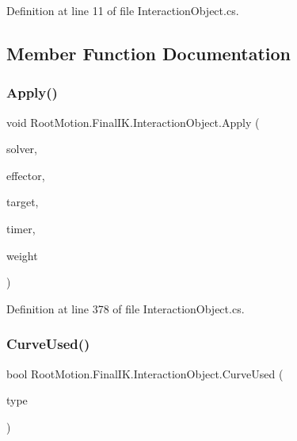 Definition at line 11 of file Interaction\+Object.\+cs.



\subsection{Member Function Documentation}
\mbox{\label{class_root_motion_1_1_final_i_k_1_1_interaction_object_a0aaccdd85aa57b6cbb254594846e18e1}} 
\subsubsection{\texorpdfstring{Apply()}{Apply()}}
{\footnotesize\ttfamily void Root\+Motion.\+Final\+I\+K.\+Interaction\+Object.\+Apply (\begin{DoxyParamCaption}\item[{\mbox{\hyperlink{class_root_motion_1_1_final_i_k_1_1_i_k_solver_full_body_biped}{I\+K\+Solver\+Full\+Body\+Biped}}}]{solver,  }\item[{\mbox{\hyperlink{namespace_root_motion_1_1_final_i_k_ae0dd2058c7667b6f132c11a6b860c14a}{Full\+Body\+Biped\+Effector}}}]{effector,  }\item[{\mbox{\hyperlink{class_root_motion_1_1_final_i_k_1_1_interaction_target}{Interaction\+Target}}}]{target,  }\item[{float}]{timer,  }\item[{float}]{weight }\end{DoxyParamCaption})}



Definition at line 378 of file Interaction\+Object.\+cs.

\mbox{\label{class_root_motion_1_1_final_i_k_1_1_interaction_object_a04c4786c46909ea5cd1b6954f69c49a2}} 
\subsubsection{\texorpdfstring{Curve\+Used()}{CurveUsed()}}
{\footnotesize\ttfamily bool Root\+Motion.\+Final\+I\+K.\+Interaction\+Object.\+Curve\+Used (\begin{DoxyParamCaption}\item[{\mbox{\hyperlink{class_root_motion_1_1_final_i_k_1_1_interaction_object_1_1_weight_curve_a74c8be2e80ace86b130c88e275300b27}{Weight\+Curve.\+Type}}}]{type }\end{DoxyParamCaption})}



